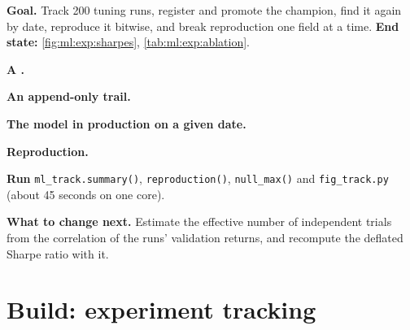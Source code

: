 \begin{tutorial}
\textbf{Goal.} Track 200 tuning runs, register and promote the champion, find it again by date, reproduce it bitwise, and break
reproduction one field at a time. \textbf{End state:} \cref{fig:ml:exp:sharpes}, \cref{tab:ml:exp:ablation}.
\begin{tutsteps}
\item \textbf{A .}
\label{lst:ml:exp:run}
\item \textbf{An append-only trail.}
\label{lst:ml:exp:audit}
\item \textbf{The model in production on a given date.}
\label{lst:ml:exp:asof}
\item \textbf{Reproduction.}
\label{lst:ml:exp:repro}
\item \textbf{Run} \texttt{ml\_track.summary()}, \texttt{reproduction()}, \texttt{null\_max()} and \texttt{fig\_track.py}
(about 45 seconds on one core).
\end{tutsteps}
\textbf{What to change next.} Estimate the effective number of independent trials from the correlation of the runs' validation
returns, and recompute the deflated Sharpe ratio with it.
\end{tutorial}

\section{Build: experiment tracking}\label{bld:ml:experiment-tracking-and-reproducibility:exptrack}

